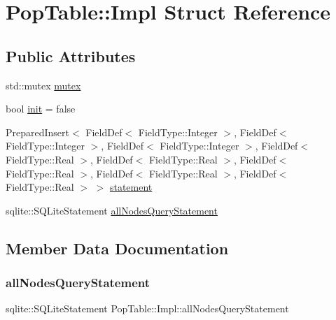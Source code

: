 \hypertarget{struct_pop_table_1_1_impl}{}\section{Pop\+Table\+::Impl Struct Reference}
\label{struct_pop_table_1_1_impl}
\subsection*{Public Attributes}
\begin{DoxyCompactItemize}
\item 
std\+::mutex \mbox{\hyperlink{struct_pop_table_1_1_impl_ae36e4a33bdf225d64e8e77975529958c}{mutex}}
\item 
bool \mbox{\hyperlink{struct_pop_table_1_1_impl_ad63a58a3318f5c023f32953837301237}{init}} = false
\item 
Prepared\+Insert$<$ Field\+Def$<$ Field\+Type\+::\+Integer $>$, Field\+Def$<$ Field\+Type\+::\+Integer $>$, Field\+Def$<$ Field\+Type\+::\+Integer $>$, Field\+Def$<$ Field\+Type\+::\+Real $>$, Field\+Def$<$ Field\+Type\+::\+Real $>$, Field\+Def$<$ Field\+Type\+::\+Real $>$, Field\+Def$<$ Field\+Type\+::\+Real $>$, Field\+Def$<$ Field\+Type\+::\+Real $>$ $>$ \mbox{\hyperlink{struct_pop_table_1_1_impl_a255cd1d29cd934f08260237289aa7377}{statement}}
\item 
sqlite\+::\+S\+Q\+Lite\+Statement \mbox{\hyperlink{struct_pop_table_1_1_impl_a906fc7ed55d2f3685127cae0e1461640}{all\+Nodes\+Query\+Statement}}
\end{DoxyCompactItemize}


\subsection{Member Data Documentation}
\mbox{\label{struct_pop_table_1_1_impl_a906fc7ed55d2f3685127cae0e1461640}} 
\subsubsection{\texorpdfstring{allNodesQueryStatement}{allNodesQueryStatement}}
{\footnotesize\ttfamily sqlite\+::\+S\+Q\+Lite\+Statement Pop\+Table\+::\+Impl\+::all\+Nodes\+Query\+Statement}

\mbox{\label{struct_pop_table_1_1_impl_ad63a58a3318f5c023f32953837301237}} 
